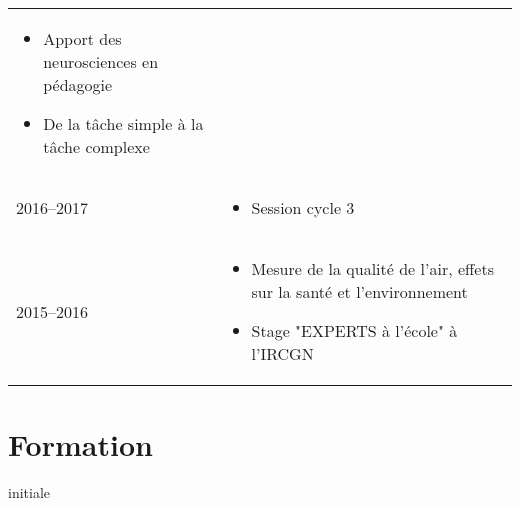 \documentclass{cv-style-cec}
\begin{document}
\begin{tabular}{lp{12cm}}
\begin{itemize}
            \item Apport des neurosciences en pédagogie
            \item De la tâche simple à la tâche complexe
        \end{itemize} \vspace{-9pt} \\
    2016--2017 & %
        \vspace{-8pt}
        \begin{itemize}
            \item Session cycle 3
        \end{itemize} \vspace{-9pt} \\
    2015--2016 & %
        \vspace{-8pt}
        \begin{itemize}
            \item Mesure de la qualité de l'air, effets sur la santé et l'environnement
            \item Stage "EXPERTS à l'école" à l'IRCGN
        \end{itemize} \\
\end{tabular}


\vspace{-2ex}
\section{Formation}{ initiale}
\vspace{-1ex}
\end{document}
